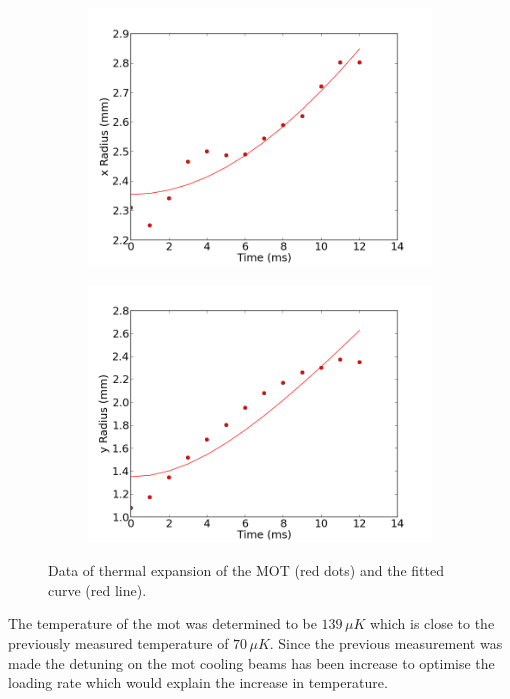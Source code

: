\begin{figure}[h]
\begin{subfigure}[b]{0.5\textwidth}
    \includegraphics[width=\textwidth]{figs/final_temp_fitting_x.png}
\end{subfigure}\begin{subfigure}[b]{0.5\textwidth}
    \includegraphics[width=\textwidth]{figs/final_temp_fitting_y.png}
\end{subfigure}
\caption{Data of thermal expansion of the MOT (red dots) and the fitted curve (red line).}
\label{fig:temp_fits}
\end{figure}

The temperature of the \gls{mot} was determined to be $139\,\unit{\mu K}$ which is close to the previously measured temperature of $70\,\unit{\mu K}$. Since the previous measurement was made the detuning on the \gls{mot} cooling beams has been increase to optimise the loading rate which would explain the increase in temperature.

